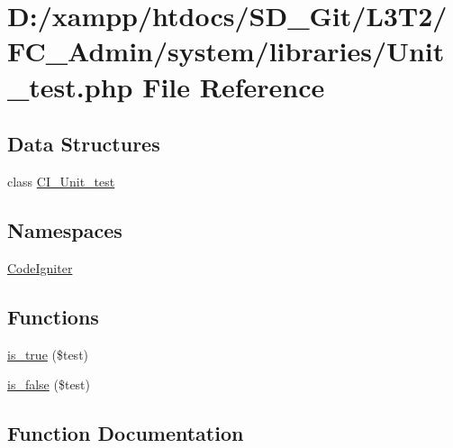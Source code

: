 \hypertarget{_admin_2system_2libraries_2_unit__test_8php}{}\section{D\+:/xampp/htdocs/\+S\+D\+\_\+\+Git/\+L3\+T2/\+F\+C\+\_\+\+Admin/system/libraries/\+Unit\+\_\+test.php File Reference}
\label{_admin_2system_2libraries_2_unit__test_8php}
\subsection*{Data Structures}
\begin{DoxyCompactItemize}
\item 
class \hyperlink{class_c_i___unit__test}{C\+I\+\_\+\+Unit\+\_\+test}
\end{DoxyCompactItemize}
\subsection*{Namespaces}
\begin{DoxyCompactItemize}
\item 
 \hyperlink{namespace_code_igniter}{Code\+Igniter}
\end{DoxyCompactItemize}
\subsection*{Functions}
\begin{DoxyCompactItemize}
\item 
\hyperlink{_admin_2system_2libraries_2_unit__test_8php_acf75638429e85f5d2eb23c85ce46f85b}{is\+\_\+true} (\$test)
\item 
\hyperlink{_admin_2system_2libraries_2_unit__test_8php_a2fdef4e023452d31fcf5b3085bc9b25f}{is\+\_\+false} (\$test)
\end{DoxyCompactItemize}


\subsection{Function Documentation}
\hypertarget{_admin_2system_2libraries_2_unit__test_8php_a2fdef4e023452d31fcf5b3085bc9b25f}{}
